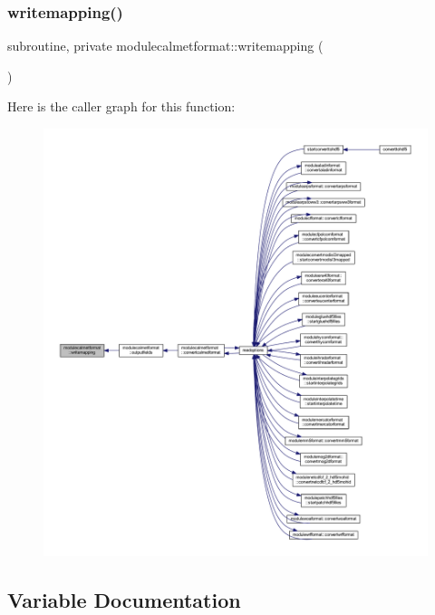 \subsubsection{\texorpdfstring{writemapping()}{writemapping()}}
{\footnotesize\ttfamily subroutine, private modulecalmetformat\+::writemapping (\begin{DoxyParamCaption}{ }\end{DoxyParamCaption})\hspace{0.3cm}{\ttfamily [private]}}

Here is the caller graph for this function\+:\nopagebreak
\begin{figure}[H]
\begin{center}
\leavevmode
\includegraphics[width=350pt]{namespacemodulecalmetformat_ab777b0fc84a3a4b2505fadc6db40580f_icgraph}
\end{center}
\end{figure}


\subsection{Variable Documentation}
\mbox{\label{namespacemodulecalmetformat_a30d8b055512bccb5b1dd9cd00e4c790b}} 
